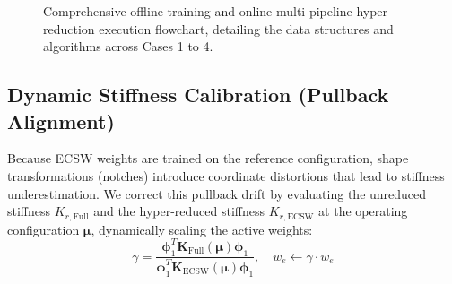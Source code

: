 \begin{figure}[p]
{%
    }
    \caption{Comprehensive offline training and online multi-pipeline hyper-reduction execution flowchart, detailing the data structures and algorithms across Cases 1 to 4.}
    \label{fig:ecsw_flowchart}
\end{figure}

\subsection{Dynamic Stiffness Calibration (Pullback Alignment)}
Because ECSW weights are trained on the reference configuration, shape transformations (notches) introduce coordinate distortions that lead to stiffness underestimation. We correct this pullback drift by evaluating the unreduced stiffness $K_{r,\text{Full}}$ and the hyper-reduced stiffness $K_{r,\text{ECSW}}$ at the operating configuration $\boldsymbol{\mu}$, dynamically scaling the active weights:
\begin{equation}
    \gamma = \frac{\boldsymbol{\phi}_1^T \mathbf{K}_{\text{Full}}(\boldsymbol{\mu}) \boldsymbol{\phi}_1}{\boldsymbol{\phi}_1^T \mathbf{K}_{\text{ECSW}}(\boldsymbol{\mu}) \boldsymbol{\phi}_1}, \quad w_e \leftarrow \gamma \cdot w_e
\end{equation}

